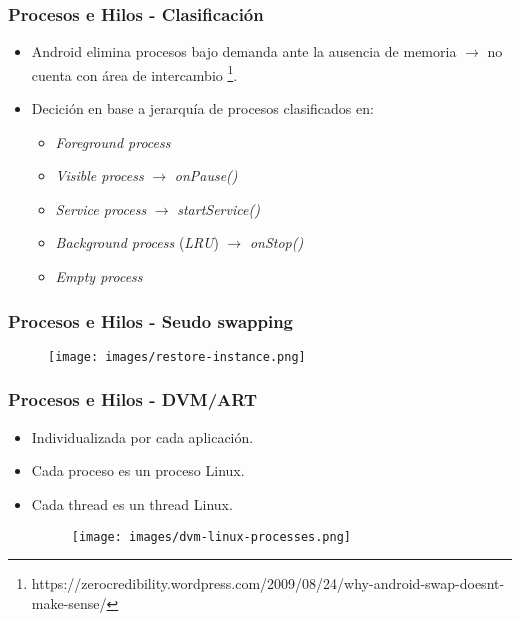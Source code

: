 \begin{frame}
  \frametitle{Procesos e Hilos - Clasificación}
  \begin{itemize}
    \item Android elimina procesos bajo demanda ante la ausencia de memoria $\rightarrow$ no cuenta con área de intercambio \footnote{https://zerocredibility.wordpress.com/2009/08/24/why-android-swap-doesnt-make-sense/}.
    
    \item Decición en base a jerarquía de procesos clasificados en:
    \begin{itemize}
     \item \textit{Foreground process}
     \item \textit{Visible process} $\rightarrow$ \textit{onPause()}
     \item \textit{Service process} $\rightarrow$ \textit{startService()}
     \item \textit{Background process} (\emph{LRU}) $\rightarrow$ \textit{onStop()}
     \item \textit{Empty process}
    \end{itemize}       
  \end{itemize}
\end{frame}

\begin{frame}
  \frametitle{Procesos e Hilos - Seudo swapping}
  \begin{figure}
      \centering
      \texttt{[image: images/restore-instance.png]}
  \end{figure}
\end{frame}

\begin{frame}
  \frametitle{Procesos e Hilos - DVM/ART}
  \begin{itemize}
      \item Individualizada por cada aplicación.
      
      \item Cada proceso es un proceso Linux.
      
      \item Cada thread es un thread Linux.
      
      \begin{figure}
  \centering
  \texttt{[image: images/dvm-linux-processes.png]}
      \end{figure}
  \end{itemize}
\end{frame}


